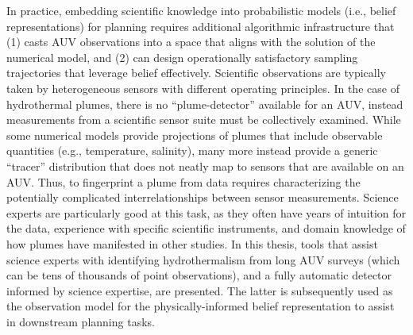 In practice, embedding scientific knowledge into probabilistic models (i.e., belief representations) for planning requires additional algorithmic infrastructure that (1) casts AUV observations into a space that aligns with the solution of the numerical model, and (2) can design operationally satisfactory sampling trajectories that leverage belief effectively.
Scientific observations are typically taken by heterogeneous sensors with different operating principles.
In the case of hydrothermal plumes, there is no ``plume-detector'' available for an AUV, instead measurements from a scientific sensor suite must be collectively examined.
While some numerical models provide projections of plumes that include observable quantities\autocite{speer1989model} (e.g., temperature, salinity), many more instead provide a generic ``tracer'' distribution that does not neatly map to sensors that are available on an AUV.
Thus, to fingerprint a plume from data requires characterizing the potentially complicated interrelationships between sensor measurements\autocite{jakuba2007stochastic}.
Science experts are particularly good at this task, as they often have years of intuition for the data, experience with specific scientific instruments, and domain knowledge of how plumes have manifested in other studies.
In this thesis, tools that assist science experts with identifying hydrothermalism from long AUV surveys (which can be tens of thousands of point observations), and a fully automatic detector informed by science expertise, are presented.
The latter is subsequently used as the observation model for the physically-informed belief representation to assist in downstream planning tasks.



